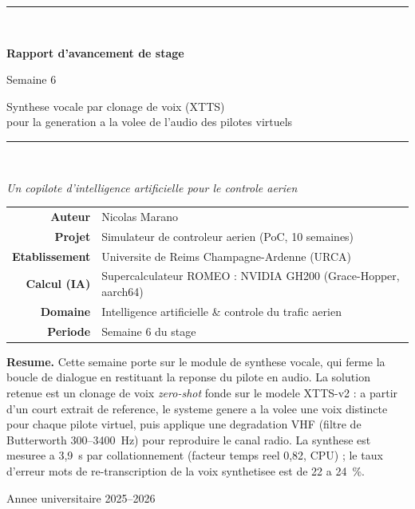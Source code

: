 \documentclass[11pt,a4paper]{article}
\begin{document}
\begin{titlepage}
\centering
\vspace*{1.2cm}
{\color{atcblue}\rule{\textwidth}{2pt}}\\[0.5cm]
{\Huge\bfseries\color{atcblue} Rapport d'avancement de stage\par}
\vspace{0.35cm}
{\LARGE\color{atcteal} Semaine 6\par}
\vspace{0.25cm}
{\large Synthese vocale par clonage de voix (XTTS) \\[2pt]
pour la generation a la volee de l'audio des pilotes virtuels\par}
\vspace{0.4cm}
{\color{atcblue}\rule{\textwidth}{2pt}}\\[1.0cm]

{\large\itshape Un copilote d'intelligence artificielle pour le controle aerien\par}
\vspace{1.6cm}

\begin{tabular}{rl}
\large\bfseries Auteur & \large Nicolas Marano\\[4pt]
\large\bfseries Projet & \large Simulateur de controleur aerien (PoC, 10 semaines)\\[4pt]
\large\bfseries Etablissement & \large Universite de Reims Champagne-Ardenne (URCA)\\[4pt]
\large\bfseries Calcul (IA) & \large Supercalculateur ROMEO : NVIDIA GH200 (Grace-Hopper, aarch64)\\[4pt]
\large\bfseries Domaine & \large Intelligence artificielle \& controle du trafic aerien\\[4pt]
\large\bfseries Periode & \large Semaine 6 du stage\\
\end{tabular}

\vfill
\begin{tcolorbox}[colback=lightgray, colframe=atcblue, arc=3pt, width=0.92\textwidth, center,
  left=12pt, right=12pt, top=8pt, bottom=8pt]
\small\centering
\textbf{Resume.} Cette semaine porte sur le module de synthese vocale, qui ferme la
boucle de dialogue en restituant la reponse du pilote en audio. La solution retenue
est un clonage de voix \emph{zero-shot} fonde sur le modele XTTS-v2 : a partir d'un
court extrait de reference, le systeme genere a la volee une voix distincte pour
chaque pilote virtuel, puis applique une degradation VHF (filtre de Butterworth
300--3400~Hz) pour reproduire le canal radio. La synthese est mesuree a 3,9~s par
collationnement (facteur temps reel 0,82, CPU) ; le taux d'erreur mots de
re-transcription de la voix synthetisee est de 22 a 24~\%.
\end{tcolorbox}
\vspace{0.6cm}
{\small Annee universitaire 2025--2026}
\end{titlepage}
\end{document}
